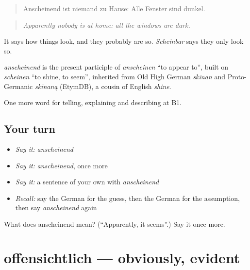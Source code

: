 \begin{quote}
Anscheinend ist niemand zu Hause: Alle Fenster sind dunkel.
\end{quote}

\begin{quote}
\emph{Apparently nobody is at home: all the windows are dark.}
\end{quote}

It says how things look, and they probably are so. \emph{Scheinbar} says they only look so.

\begin{cousinweb}
\emph{anscheinend} is the present participle of \emph{anscheinen} \textquotedblleft{}to appear to\textquotedblright{}, built on \emph{scheinen} \textquotedblleft{}to shine, to seem\textquotedblright{}, inherited from Old High German \emph{skīnan} and Proto-Germanic \emph{skīnaną} (EtymDB), a cousin of English \emph{shine}.
\end{cousinweb}

\begin{grammarlens}[title={What you've built}]
One more word for telling, explaining and describing at B1.
\end{grammarlens}

\subsection*{Your turn}
\begin{itemize}
\raggedright
  \item \emph{Say it:} \emph{anscheinend}
  \item \emph{Say it:} \emph{anscheinend}, once more
  \item \emph{Say it:} a sentence of your own with \emph{anscheinend}
  \item \emph{Recall:} say the German for the guess, then the German for the assumption, then say \emph{anscheinend} again
\end{itemize}

\begin{tcolorbox}[breakable,colback=teal!4,colframe=teal!35!black,title={Before you move on}]
What does anscheinend mean? (\textquotedblleft{}Apparently, it seems\textquotedblright{}.) Say it once more.
\end{tcolorbox}
\section[offensichtlich]{offensichtlich — obviously, evident}


